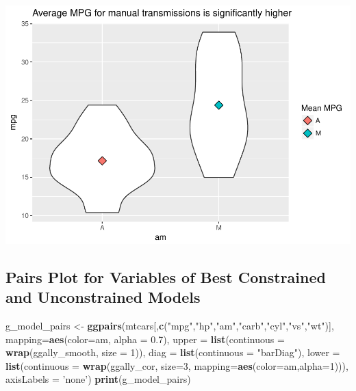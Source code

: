 \documentclass[]{article}
\newenvironment{Shaded}{\begin{snugshade}}{\end{snugshade}}
\newcommand{\KeywordTok}[1]{\textcolor[rgb]{0.13,0.29,0.53}{\textbf{{#1}}}}
\newcommand{\DataTypeTok}[1]{\textcolor[rgb]{0.13,0.29,0.53}{{#1}}}
\newcommand{\DecValTok}[1]{\textcolor[rgb]{0.00,0.00,0.81}{{#1}}}
\newcommand{\FloatTok}[1]{\textcolor[rgb]{0.00,0.00,0.81}{{#1}}}
\newcommand{\StringTok}[1]{\textcolor[rgb]{0.31,0.60,0.02}{{#1}}}
\newcommand{\NormalTok}[1]{{#1}}
\let\origfigure\figure
\let\endorigfigure\endfigure
\renewenvironment{figure}[1][2] {
    \expandafter\origfigure\expandafter[H]
} {
    \endorigfigure
}
\begin{document}
\begin{figure}[htbp]
\centering
\includegraphics{Regression_Models_Course_Project_files/figure-latex/violin_plot-1.pdf}
\caption{Violin plot of MPG vs.~Transmission type}
\end{figure}

\subsection{Pairs Plot for Variables of Best Constrained and
Unconstrained
Models}\label{pairs-plot-for-variables-of-best-constrained-and-unconstrained-models}

\begin{Shaded}
\begin{Highlighting}[]
\NormalTok{g_model_pairs <-}\StringTok{ }\KeywordTok{ggpairs}\NormalTok{(mtcars[,}\KeywordTok{c}\NormalTok{(}\StringTok{"mpg"}\NormalTok{,}\StringTok{"hp"}\NormalTok{,}\StringTok{"am"}\NormalTok{,}\StringTok{"carb"}\NormalTok{,}\StringTok{"cyl"}\NormalTok{,}\StringTok{"vs"}\NormalTok{,}\StringTok{"wt"}\NormalTok{)], }
                 \DataTypeTok{mapping=}\KeywordTok{aes}\NormalTok{(}\DataTypeTok{color=}\NormalTok{am, }\DataTypeTok{alpha =} \FloatTok{0.7}\NormalTok{),}
                 \DataTypeTok{upper =} \KeywordTok{list}\NormalTok{(}\DataTypeTok{continuous =} \KeywordTok{wrap}\NormalTok{(ggally_smooth, }\DataTypeTok{size =} \DecValTok{1}\NormalTok{)),}
                 \DataTypeTok{diag =} \KeywordTok{list}\NormalTok{(}\DataTypeTok{continuous =} \StringTok{"barDiag"}\NormalTok{), }\DataTypeTok{lower =} \KeywordTok{list}\NormalTok{(}\DataTypeTok{continuous =} 
                 \KeywordTok{wrap}\NormalTok{(ggally_cor, }\DataTypeTok{size=}\DecValTok{3}\NormalTok{, }\DataTypeTok{mapping=}\KeywordTok{aes}\NormalTok{(}\DataTypeTok{color=}\NormalTok{am,}\DataTypeTok{alpha=}\DecValTok{1}\NormalTok{))), }
                 \DataTypeTok{axisLabels =} \StringTok{'none'}\NormalTok{)}
\KeywordTok{print}\NormalTok{(g_model_pairs)}
\end{Highlighting}
\end{Shaded}
\end{document}
